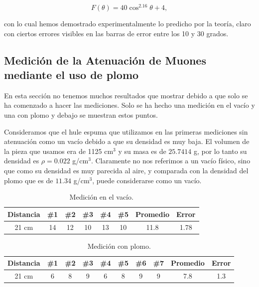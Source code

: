 \documentclass[a4paper,10pt]{article}
\numberwithin{equation}{section}
\begin{document}
\begin{equation}
  F(\theta) = 40\cos^{2.16}{\theta} + 4 ,
\end{equation}

con lo cual hemos demostrado experimentalmente lo predicho por la teoría, claro 
con ciertos errores visibles en las barras de error entre los 10 y 30 grados.



\subsection{Medición de la Atenuación de Muones mediante el uso de plomo}

En esta sección no tenemos muchos resultados que mostrar debido a que solo se ha 
comenzado a hacer las mediciones. Solo se ha hecho una medición en el vacío y 
una con plomo y debajo se muestran estos puntos.

\vspace{.3cm}

Consideramos que el hule espuma que utilizamos en las primeras mediciones sin atenuación  como  un vacío debido a que su densidad es muy baja. El volumen de la 
pieza que usamos era de 1125 cm$^3$ y su masa es de $25.7414$ g, por lo tanto 
su densidad es $\rho = 0.022$ g/cm$^3$. Claramente no nos referimos a un vacío 
físico, sino que como su densidad es muy parecida al aire, y comparada con la 
densidad del plomo que es de $11.34$ g/cm$^3$, puede considerarse como un vacío.

\begin{table}[H]
\centering
\caption{Medición en el vacío.}
\begin{tabular}{|c|c|c|c|c|c|c|c|}
\hline 
Distancia & \#1 & \#2 & \#3 & \#4 & \#5 & Promedio & Error \\ 
\hline 
21 cm & 14 & 12 & 10 & 13 & 10 & 11.8 &  1.78 \\ 
\hline 
\end{tabular}
\end{table}

\begin{table}[H]
\centering
\caption{Medición con plomo.}
\begin{tabular}{|c|c|c|c|c|c|c|c|c|c|}
\hline 
Distancia & \#1 & \#2 & \#3 & \#4 & \#5 & \#6 & \#7 & Promedio & Error \\ 
\hline 
21 cm & 6 & 8 & 9 & 6 & 8 & 9 & 9 & 7.8 & 1.3 \\ 
\hline 
\end{tabular}
\end{table}
\end{document}

